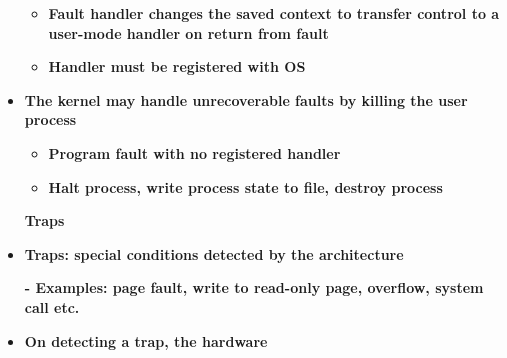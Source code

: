 \documentclass[12pt]{article}
\begin{document}
\begin{itemize}
\begin{itemize}
	\item {\fontsize{16pt}{19.2pt}\selectfont \textbf{Fault handler changes the saved context to transfer control to a user-mode handler on return from fault}\par}\par

	\item {\fontsize{16pt}{19.2pt}\selectfont \textbf{Handler must be registered with OS}\par}
\end{itemize}\par

	\item {\fontsize{16pt}{19.2pt}\selectfont \textbf{The kernel may handle unrecoverable faults by killing the user process}\par}\par

\begin{itemize}
	\item {\fontsize{16pt}{19.2pt}\selectfont \textbf{Program fault with no registered handler}\par}\par

	\item {\fontsize{16pt}{19.2pt}\selectfont \textbf{Halt process, write process state to file, destroy process}\par}
\end{itemize}\par


\vspace{\baselineskip}
\begin{adjustwidth}{0.75in}{0.0in}
{\fontsize{24pt}{28.8pt}\selectfont \textbf{Traps}\par}\par

\end{adjustwidth}

	\item {\fontsize{16pt}{19.2pt}\selectfont \textbf{Traps: special conditions detected by the architecture}\par}\par

{\fontsize{16pt}{19.2pt}\selectfont \textbf{- Examples: page fault, write to read-only page, overflow, system call etc.}\par}\par

	\item {\fontsize{16pt}{19.2pt}\selectfont \textbf{On detecting a trap, the hardware}\par}\par


\end{itemize}
\end{document}

